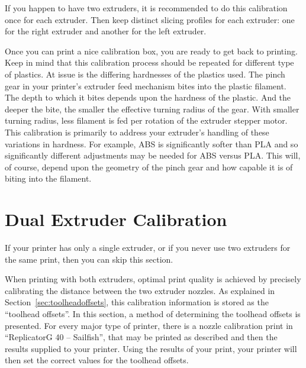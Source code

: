 If you happen to have two extruders, it is recommended to do this
calibration once for each extruder.  Then keep distinct slicing
profiles for each extruder: one for the right extruder and another
for the left extruder.

Once you can print a nice calibration box, you are ready to get back
to printing.  Keep in mind that this calibration process
should be repeated for different type of plastics.  At issue is the
differing hardnesses of the plastics used.  The pinch gear in your
printer's extruder feed mechanism bites into the plastic filament.
The depth to which it bites depends upon the hardness of the plastic.
And the deeper the bite, the smaller the effective turning radius of
the gear.  With smaller turning radius, less filament is fed per
rotation of the extruder stepper motor.  This calibration is primarily to address your extruder's handling of these variations in hardness.  For example, ABS is
significantly softer than PLA and so significantly different
adjustments may be needed for ABS versus PLA.  This will, of course,
depend upon the geometry of the pinch gear and how capable it is of
biting into the filament.


\section{Dual Extruder Calibration} \label{sec:dual-calib}

If your printer has only a single extruder, or if you never use two extruders for the same print, then you can skip this section.

When printing with both extruders, optimal print quality is achieved by precisely calibrating the distance between the two extruder nozzles.  As explained in Section~\ref{sec:toolheadoffsets}, this calibration information is stored as the ``toolhead offsets''.  In this section, a method of determining the toolhead offsets is presented. For every major type of printer, there is a nozzle calibration print in ``ReplicatorG 40 -- Sailfish'', that may be printed as described and then the results supplied to your printer.  Using the results of your print, your printer will then set the correct values for the toolhead offsets.

